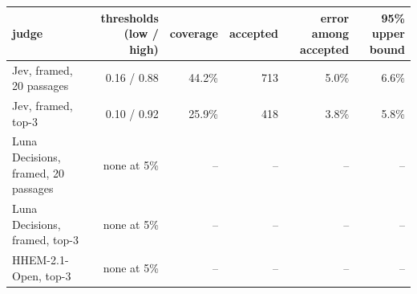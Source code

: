 \begin{tabular}{lrrrrr}
\toprule
judge & thresholds (low / high) & coverage & accepted & error among accepted & 95\% upper bound \\
\midrule
Jev, framed, 20 passages & 0.16 / 0.88 & 44.2\% & 713 & 5.0\% & 6.6\% \\
Jev, framed, top-3 & 0.10 / 0.92 & 25.9\% & 418 & 3.8\% & 5.8\% \\
Luna Decisions, framed, 20 passages & none at 5\% & -- & -- & -- & -- \\
Luna Decisions, framed, top-3 & none at 5\% & -- & -- & -- & -- \\
HHEM-2.1-Open, top-3 & none at 5\% & -- & -- & -- & -- \\
\bottomrule
\end{tabular}
